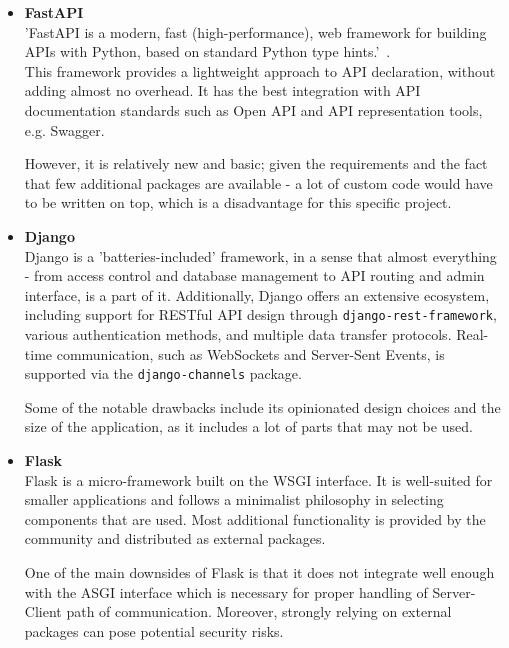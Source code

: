 \begin{itemize}
    \item \textbf{FastAPI} \\
    'FastAPI is a modern, fast (high-performance), web framework for building APIs
    with Python, based on standard Python type hints.'~\cite{fastapi}. \\
    This framework provides a lightweight approach to API declaration, without adding almost no overhead.
    It has the best integration with API documentation standards such as
    Open API and API representation tools, e.g. Swagger.

    However, it is relatively new and basic; given the requirements and the fact that
    few additional packages are available - a lot of custom code would have
    to be written on top, which is a disadvantage for this specific project.

    \item \textbf{Django} \\
    Django is a 'batteries-included' framework, in a sense that almost everything -
    from access control and database management to API routing and admin interface,
    is a part of it.\cite{django}
    Additionally, Django offers an extensive ecosystem, including support for RESTful API design through
    \texttt{django-rest-framework}\cite{drf}, various authentication methods,
    and multiple data transfer protocols. Real-time communication, such as WebSockets and Server-Sent Events,
    is supported via the \texttt{django-channels}\cite{django_channels} package.

    Some of the notable drawbacks include its opinionated design choices and the size of the application,
    as it includes a lot of parts that may not be used.

    \item \textbf{Flask} \\
    Flask is a micro-framework built on the WSGI interface.
    It is well-suited for smaller applications and follows a minimalist philosophy
    in selecting components that are used.\cite{flask} Most additional functionality is provided by
    the community and distributed as external packages.

    One of the main downsides of Flask is that it does not integrate well enough with the ASGI
    interface which is necessary for proper handling of Server-Client path of communication.
    Moreover, strongly relying on external packages can pose potential security risks.
\end{itemize}

